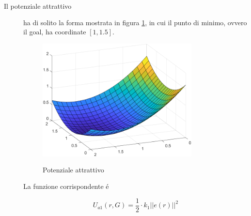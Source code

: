 \documentclass[14pt,a4paper]{extarticle}
\begin{document}
\begin{description}
\item[Il potenziale attrattivo] ha di solito la forma mostrata in figura \ref{potA}, in cui il punto di minimo, ovvero il goal, ha coordinate \([1,1.5]\).
\begin{figure}[H]
\centering
\caption{Potenziale attrattivo}
\includegraphics[width=0.8\textwidth]{potA.png}
\label{potA}
\end{figure}

La funzione corrispondente é

\begin{equation}
U_{a1}(r,G) = \frac{1}{2} \cdot k_1 ||e(r)||^2
\end{equation}


\end{description}
\end{document}
